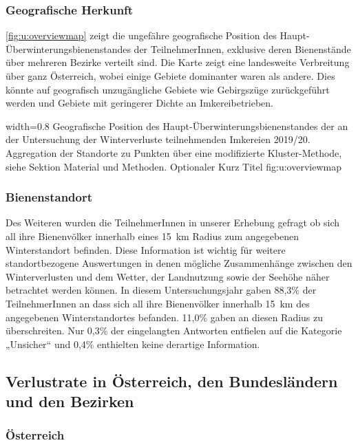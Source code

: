 \subsubsection{Geografische Herkunft}

\cref{fig:u:overviewmap} zeigt die ungefähre geografische Position des Haupt-Überwinterungsbienenstandes der TeilnehmerInnen, exklusive deren Bienenstände über mehreren Bezirke verteilt sind. Die Karte zeigt eine landesweite Verbreitung über ganz Österreich, wobei einige Gebiete dominanter waren als andere. Dies könnte auf geografisch unzugängliche Gebiete wie Gebirgszüge zurückgeführt werden und Gebiete mit geringerer Dichte an Imkereibetrieben.

  {width=0.8\textwidth} %
  {Geografische Position des Haupt-Überwinterungsbienenstandes der an der Untersuchung der Winterverluste teilnehmenden Imkereien 2019/20. Aggregation der Standorte zu Punkten über eine modifizierte Kluster-Methode, siehe Sektion Material und Methoden.} %
  {Optionaler Kurz Titel} %
  {fig:u:overviewmap} %

\subsubsection{Bienenstandort}

Des Weiteren wurden die TeilnehmerInnen in unserer Erhebung gefragt ob sich all ihre Bienenvölker innerhalb eines \SI{15}{\kilo\meter} Radius zum angegebenen Winterstandort befinden. Diese Information ist wichtig für weitere standortbezogene Auswertungen in denen mögliche Zusammenhänge zwischen den Winterverlusten und dem Wetter, der Landnutzung sowie der Seehöhe näher betrachtet werden können.
\newline
In diesem Untersuchungsjahr gaben 88,3\% der TeilnehmerInnen an dass sich all ihre Bienenvölker innerhalb \SI{15}{\kilo\meter} des angegebenen Winterstandortes befanden. 11,0\% gaben an diesen Radius zu überschreiten. Nur 0,3\% der eingelangten Antworten entfielen auf die Kategorie „Unsicher`` und 0,4\% enthielten keine derartige Information.

\subsection{Verlustrate in Österreich, den Bundesländern und den Bezirken}
\subsubsection{Österreich}

